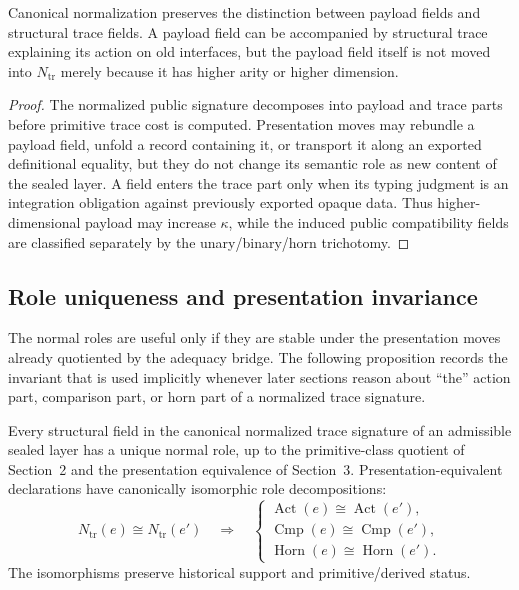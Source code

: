 \begin{lemma}
Canonical normalization preserves the distinction between payload fields and structural trace
fields.  A payload field can be accompanied by structural trace explaining its action on old
interfaces, but the payload field itself is not moved into \(N_{\mathrm{tr}}\) merely because it
has higher arity or higher dimension.
\end{lemma}

\begin{proof}
The normalized public signature decomposes into payload and trace parts before primitive
trace cost is computed.  Presentation moves may rebundle a payload field, unfold a record
containing it, or transport it along an exported definitional equality, but they do not change
its semantic role as new content of the sealed layer.  A field enters the trace part only when
its typing judgment is an integration obligation against previously exported opaque data.
Thus higher-dimensional payload may increase \(\kappa\), while the induced public
compatibility fields are classified separately by the unary/binary/horn trichotomy.
\end{proof}

\subsection{Role uniqueness and presentation invariance}

The normal roles are useful only if they are stable under the presentation moves already
quotiented by the adequacy bridge.  The following proposition records the invariant that is
used implicitly whenever later sections reason about ``the'' action part, comparison part, or
horn part of a normalized trace signature.

\begin{proposition}
Every structural field in the canonical normalized trace signature of an admissible sealed
layer has a unique normal role, up to the primitive-class quotient of Section~2 and the
presentation equivalence of Section~3.  Presentation-equivalent declarations have canonically
isomorphic role decompositions:
\[
  N_{\mathrm{tr}}(e)
  \cong
  N_{\mathrm{tr}}(e')
  \quad\Longrightarrow\quad
  \begin{cases}
    \operatorname{Act}(e) \cong \operatorname{Act}(e'),\\
    \operatorname{Cmp}(e) \cong \operatorname{Cmp}(e'),\\
    \operatorname{Horn}(e) \cong \operatorname{Horn}(e').
  \end{cases}
\]
The isomorphisms preserve historical support and primitive/derived status.
\end{proposition}

